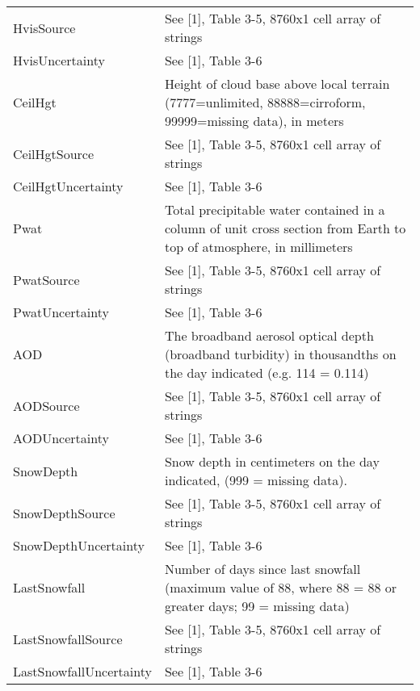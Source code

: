 \documentclass[letterpaper,10pt,english]{sphinxmanual}
\begin{document}
\begin{fulllineitems}
\begin{longtable}{|l|p{11cm}|}
HvisSource
 & 
See {[}1{]}, Table 3-5, 8760x1 cell array of strings
\\

HvisUncertainty
 & 
See {[}1{]}, Table 3-6
\\

CeilHgt
 & 
Height of cloud base above local terrain (7777=unlimited, 88888=cirroform, 99999=missing data), in meters
\\

CeilHgtSource
 & 
See {[}1{]}, Table 3-5, 8760x1 cell array of strings
\\

CeilHgtUncertainty
 & 
See {[}1{]}, Table 3-6
\\

Pwat
 & 
Total precipitable water contained in a column of unit cross section from Earth to top of atmosphere, in millimeters
\\

PwatSource
 & 
See {[}1{]}, Table 3-5, 8760x1 cell array of strings
\\

PwatUncertainty
 & 
See {[}1{]}, Table 3-6
\\

AOD
 & 
The broadband aerosol optical depth (broadband turbidity) in thousandths on the day indicated (e.g. 114 = 0.114)
\\

AODSource
 & 
See {[}1{]}, Table 3-5, 8760x1 cell array of strings
\\

AODUncertainty
 & 
See {[}1{]}, Table 3-6
\\

SnowDepth
 & 
Snow depth in centimeters on the day indicated, (999 = missing data).
\\

SnowDepthSource
 & 
See {[}1{]}, Table 3-5, 8760x1 cell array of strings
\\

SnowDepthUncertainty
 & 
See {[}1{]}, Table 3-6
\\

LastSnowfall
 & 
Number of days since last snowfall (maximum value of 88, where 88 = 88 or greater days; 99 = missing data)
\\

LastSnowfallSource
 & 
See {[}1{]}, Table 3-5, 8760x1 cell array of strings
\\

LastSnowfallUncertainty
 & 
See {[}1{]}, Table 3-6
\\


\end{longtable}
\end{fulllineitems}
\end{document}

